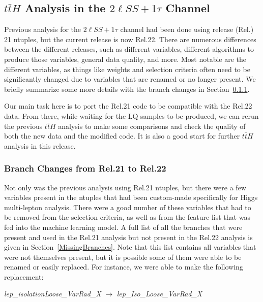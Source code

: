 \subsection{\texorpdfstring{$t\bar{t}H$}{ttH} Analysis in the \texorpdfstring{$2\ell SS + 1\tau$}{2lSS+1tau} Channel}
Previous analysis for the $2\ell SS + 1\tau$ channel had been done using release (Rel.) 21 ntuples, but the current release is now Rel.22. There are numerous differences between the different releases, such as different variables, different algorithms to produce those variables, general data quality, and more. Most notable are the different variables, as things like weights and selection criteria often need to be significantly changed due to variables that are renamed or no longer present. We briefly summarize some more details with the branch changes in Section~\ref{branchChanges}. 

Our main task here is to port the Rel.21 code to be compatible with the Rel.22 data. From there, while waiting for the LQ samples to be produced, we can rerun the previous $t\bar{t}H$ analysis to make some comparisons and check the quality of both the new data and the modified code. It is also a good start for further $t\bar{t}H$ analysis in this release.


\subsubsection{Branch Changes from Rel.21 to Rel.22}\label{branchChanges}
    Not only was the previous analysis using Rel.21 ntuples, but there were a few variables present in the ntuples that had been custom-made specifically for Higgs multi-lepton analysis. There were a good number of these variables that had to be removed from the selection criteria, as well as from the feature list that was fed into the machine learning model. A full list of all the branches that were present and used in the Rel.21 analysis but not present in the Rel.22 analysis is given in Section~\ref{MissingBranches}. Note that this list contains all variables that were not themselves present, but it is possible some of them were able to be renamed or easily replaced. For instance, we were able to make the following replacement:

    \vspace*{2mm}
    \begin{center}
        \textit{lep\_isolationLoose\_VarRad\_X} $\rightarrow$ \textit{lep\_Iso\_Loose\_VarRad\_X}
    \end{center}
    \vspace*{2mm}

